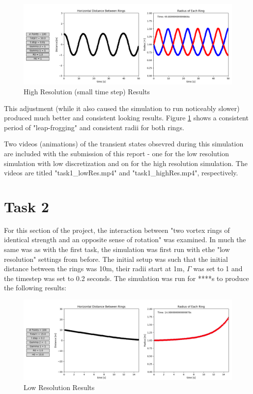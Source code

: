 \documentclass[10pt]{article}
\begin{document}
\begin{figure}[H]
   \centering
   \includegraphics[width=1\linewidth]{figures/task1_fine.png}
   \caption{High Resolution (small time step) Results}
   \label{task1_fine}
\end{figure}


This adjustment (while it also caused the simulation to run noticeably slower) produced much better and consistent looking results. Figure \ref{task1_fine} shows a consistent period of "leap-frogging" and consistent radii for both rings.


Two videos (animations) of the transient states obsevred during this simulation are included with the submission of this report - one for the low resolution simulation with low discretization and on for the high resolution simulation. The videos are titled "task1\_lowRes.mp4" and "task1\_highRes.mp4", respectively.



\section{Task 2}

For this section of the project, the interaction between "two vortex rings of identical strength and an opposite sense of rotation" was examined. In much the same was as with the first task, the simulation was first run with ethe "low resolution" settings from before. The initial setup was such that the initial distance between the rings was 10m, their radii start at 1m, $\Gamma$ was set to 1 and the timestep was set to 0.2 seconds. The simulation was run for ****s to produce the following results:

\begin{figure}[H]
   \centering
   \includegraphics[width=1\linewidth]{figures/task2_coarse.png}
   \caption{Low Resolution Results}
   \label{task2_coarse}
\end{figure}
\end{document}
